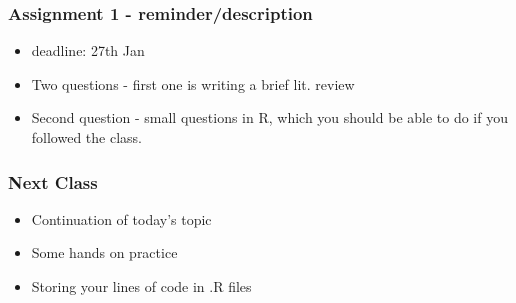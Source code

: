 \documentclass{beamer}
\begin{document}
\begin{frame}
\frametitle{Assignment 1 - reminder/description}
\begin{itemize}
\item deadline: 27th Jan
\item Two questions - first one is writing a brief lit. review
\item Second question - small questions in R, which you should be able to do if you followed the class.
\end{itemize}
\end{frame}

\begin{frame}
\frametitle{Next Class}
\begin{itemize}
\item Continuation of today's topic
\item Some hands on practice
\item Storing your lines of code in .R files
\end{itemize}
\end{frame}

\end{document}
